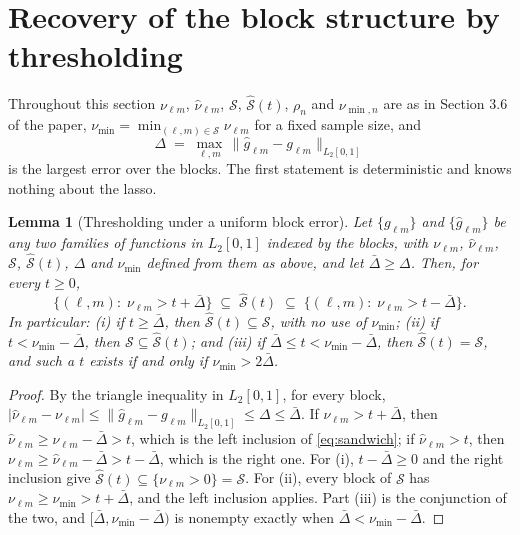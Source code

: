 \documentclass[10pt]{book}
\newtheorem{lemma}{Lemma}[section]
\theoremstyle{definition}
\newcommand{\cv}{\ell}
\newcommand{\md}{m}
\newcommand{\gcomp}[2]{g_{#1#2}}
\begin{document}
{\color{colR1}
\section{Recovery of the block structure by thresholding}
\setcounter{equation}{0}

Throughout this section $\nu_{\cv\md}$, $\widehat{\nu}_{\cv\md}$, $\mathcal{S}$,
$\widehat{\mathcal{S}}(t)$, $\rho_n$ and $\nu_{\min,n}$ are as in Section 3.6 of the paper,
$\nu_{\min} = \min_{(\cv,\md)\in \mathcal{S}}\nu_{\cv\md}$ for a fixed sample size, and
\[
  \Delta \;=\; \max_{\cv,\md}\,
  \bigl\lVert \widehat{g}_{\cv\md} - \gcomp{\cv}{\md} \bigr\rVert_{L_2[0,1]}
\]
is the largest error over the blocks. The first statement is deterministic
and knows nothing about the lasso.

\begin{lemma}[Thresholding under a uniform block error]
\label{lem:sandwich}
Let $\{\gcomp{\cv}{\md}\}$ and $\{\widehat{g}_{\cv\md}\}$ be any two families
of functions in $L_2[0,1]$ indexed by the blocks, with $\nu_{\cv\md}$,
$\widehat{\nu}_{\cv\md}$, $\mathcal{S}$, $\widehat{\mathcal{S}}(t)$, $\Delta$ and $\nu_{\min}$ defined
from them as above, and let $\bar{\Delta} \ge \Delta$. Then, for every $t \ge 0$,
\begin{equation}
  \label{eq:sandwich}
  \bigl\{(\cv,\md) :\; \nu_{\cv\md} > t + \bar{\Delta}\bigr\}
  \;\subseteq\; \widehat{\mathcal{S}}(t) \;\subseteq\;
  \bigl\{(\cv,\md) :\; \nu_{\cv\md} > t - \bar{\Delta}\bigr\} .
\end{equation}
In particular: (i) if $t \ge \bar{\Delta}$, then $\widehat{\mathcal{S}}(t) \subseteq \mathcal{S}$, with no
use of $\nu_{\min}$; (ii) if $t < \nu_{\min} - \bar{\Delta}$, then $\mathcal{S} \subseteq \widehat{\mathcal{S}}(t)$;
and (iii) if $\bar{\Delta} \le t < \nu_{\min} - \bar{\Delta}$, then $\widehat{\mathcal{S}}(t) = \mathcal{S}$, and such a $t$
exists if and only if $\nu_{\min} > 2\bar{\Delta}$.
\end{lemma}

\begin{proof}
By the triangle inequality in $L_2[0,1]$, for every block,
$|\widehat{\nu}_{\cv\md} - \nu_{\cv\md}| \le
\lVert\widehat{g}_{\cv\md} - \gcomp{\cv}{\md}\rVert_{L_2[0,1]} \le \Delta \le \bar{\Delta}$.
If $\nu_{\cv\md} > t + \bar{\Delta}$, then
$\widehat{\nu}_{\cv\md} \ge \nu_{\cv\md} - \bar{\Delta} > t$, which is the left inclusion of
\eqref{eq:sandwich}; if $\widehat{\nu}_{\cv\md} > t$, then
$\nu_{\cv\md} \ge \widehat{\nu}_{\cv\md} - \bar{\Delta} > t - \bar{\Delta}$, which is the right one. For
(i), $t - \bar{\Delta} \ge 0$ and the right inclusion give $\widehat{\mathcal{S}}(t) \subseteq
\{\nu_{\cv\md} > 0\} = \mathcal{S}$. For (ii), every block of $\mathcal{S}$ has
$\nu_{\cv\md} \ge \nu_{\min} > t + \bar{\Delta}$, and the left inclusion applies. Part (iii) is
the conjunction of the two, and $[\bar{\Delta}, \nu_{\min} - \bar{\Delta})$ is nonempty exactly when
$\bar{\Delta} < \nu_{\min} - \bar{\Delta}$.
\end{proof}

}
\end{document}

